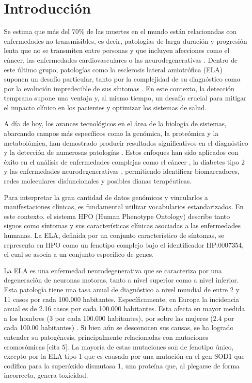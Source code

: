 \section{Introducción}
Se estima que más del 70\% de las muertes en el mundo están relacionadas con enfermedades no transmisibles, es decir, patologías de larga duración y progresión lenta que no se transmiten entre personas y que incluyen afecciones como el cáncer, las enfermedades cardiovasculares o las neurodegenerativas \cite{who2023}. Dentro de este último grupo, patologías como la esclerosis lateral amiotrófica (ELA) suponen un desafío particular, tanto por la complejidad de su diagnóstico como por la evolución impredecible de sus síntomas \cite{Hardiman2017}. En este contexto, la detección temprana supone una ventaja y, al mismo tiempo, un desafío crucial para mitigar el impacto clínico en los pacientes y optimizar los sistemas de salud. 

A día de hoy, los avances tecnológicos en el área de la biología de sistemas, abarcando campos más específicos como la genómica, la proteómica y la metabolómica, han demostrado producir resultados significativos en el diagnóstico y la detección de numerosas patologías \cite{Kitano2002}. Estos enfoques han sido aplicados con éxito en el análisis de enfermedades complejas como el cáncer \cite{Barabasi2011}, la diabetes tipo 2 \cite{Nielsen2017} y las enfermedades neurodegenerativas \cite{Tian2022}, permitiendo identificar biomarcadores, redes moleculares disfuncionales y posibles dianas terapéuticas.

Para interpretar la gran cantidad de datos genómicos y vincularlos a manifestaciones clínicas, es fundamental utilizar vocabularios estandarizados. En este contexto, el sistema HPO (Human Phenotype Ontology) \cite{hpo2025} describe tanto signos como síntomas y sus características clínicas asociadas a las enfermedades humanas. La ELA, definida por un conjunto característico de síntomas, se representa en HPO como un fenotipo complejo bajo el identificador HP:0007354, el cual se asocia a un conjunto específico de genes.

La ELA es una enfermedad neurodegenerativa que se caracteriza por una degeneración de neuronas motoras, tanto a nivel superior como a nivel inferior. Esta patología tiene una tasa anual de diagnóstico a nivel mundial de entre 2 y 11 casos por cada 100.000 habitantes. Específicamente, en Europa la incidencia anual es de 2.16 casos por cada 100.000 habitantes. Esta afecta en mayor medida a los hombres (3 por cada 100.000 habitantes), por sobre las mujeres (2.4 por cada 100.00 habitantes) \cite{Beghi_2010}.
Si bien aún se desconocen sus causas, se ha logrado entender su patogénesis, principalmente relacionadas con mutaciones cromosómicas [cita 5]. La mayoría de estas mutaciones son de fenotipo único, excepto por la ELA tipo 1 que es causada por una mutación en el gen SOD1 que codifica para la superóxido dismutasa 1, una proteína que, al plegarse de forma incorrecta, genera toxicidad.

